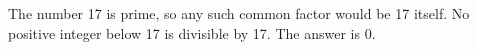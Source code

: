 The number 17 is prime, so any such common factor would be 17 itself. No positive integer below 17 is divisible by 17. The answer is $\boxed0 $.
